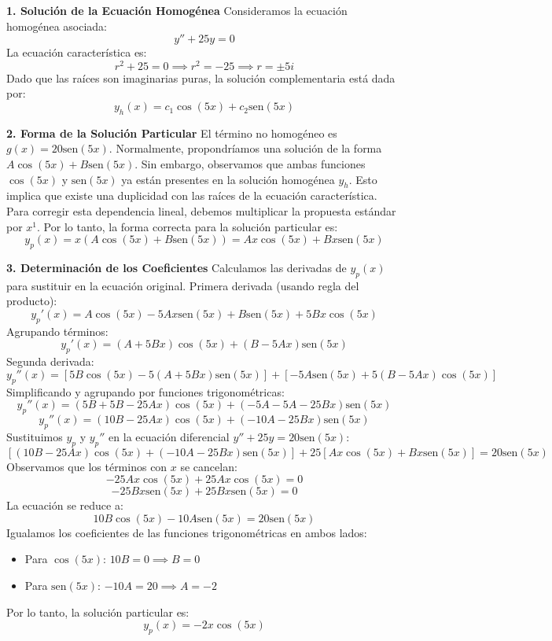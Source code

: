 \documentclass[a4paper]{article}
\begin{document}
\textbf{1. Solución de la Ecuación Homogénea}
Consideramos la ecuación homogénea asociada:
$$
y'' + 25y = 0
$$
La ecuación característica es:
$$
r^2 + 25 = 0 \implies r^2 = -25 \implies r = \pm 5i
$$
Dado que las raíces son imaginarias puras, la solución complementaria está dada por:
$$
y_h(x) = c_1 \cos(5x) + c_2 \text{sen}(5x)
$$

\textbf{2. Forma de la Solución Particular}
El término no homogéneo es $g(x) = 20\text{sen}(5x)$. Normalmente, propondríamos una solución de la forma $A \cos(5x) + B \text{sen}(5x)$. Sin embargo, observamos que ambas funciones $\cos(5x)$ y $\text{sen}(5x)$ ya están presentes en la solución homogénea $y_h$. Esto implica que existe una duplicidad con las raíces de la ecuación característica.
Para corregir esta dependencia lineal, debemos multiplicar la propuesta estándar por $x^1$. Por lo tanto, la forma correcta para la solución particular es:
$$
y_p(x) = x(A \cos(5x) + B \text{sen}(5x)) = Ax \cos(5x) + Bx \text{sen}(5x)
$$

\textbf{3. Determinación de los Coeficientes}
Calculamos las derivadas de $y_p(x)$ para sustituir en la ecuación original.
Primera derivada (usando regla del producto):
$$
y_p'(x) = A \cos(5x) - 5Ax \text{sen}(5x) + B \text{sen}(5x) + 5Bx \cos(5x)
$$
Agrupando términos:
$$
y_p'(x) = (A + 5Bx) \cos(5x) + (B - 5Ax) \text{sen}(5x)
$$
Segunda derivada:
$$
y_p''(x) = [5B \cos(5x) - 5(A + 5Bx) \text{sen}(5x)] + [-5A \text{sen}(5x) + 5(B - 5Ax) \cos(5x)]
$$
Simplificando y agrupando por funciones trigonométricas:
$$
y_p''(x) = (5B + 5B - 25Ax) \cos(5x) + (-5A - 5A - 25Bx) \text{sen}(5x)
$$
$$
y_p''(x) = (10B - 25Ax) \cos(5x) + (-10A - 25Bx) \text{sen}(5x)
$$
Sustituimos $y_p$ y $y_p''$ en la ecuación diferencial $y'' + 25y = 20\text{sen}(5x)$:
$$
[(10B - 25Ax) \cos(5x) + (-10A - 25Bx) \text{sen}(5x)] + 25[Ax \cos(5x) + Bx \text{sen}(5x)] = 20\text{sen}(5x)
$$
Observamos que los términos con $x$ se cancelan:
$$
-25Ax \cos(5x) + 25Ax \cos(5x) = 0
$$
$$
-25Bx \text{sen}(5x) + 25Bx \text{sen}(5x) = 0
$$
La ecuación se reduce a:
$$
10B \cos(5x) - 10A \text{sen}(5x) = 20\text{sen}(5x)
$$
Igualamos los coeficientes de las funciones trigonométricas en ambos lados:
\begin{itemize}
    \item Para $\cos(5x)$: $10B = 0 \implies B = 0$
    \item Para $\text{sen}(5x)$: $-10A = 20 \implies A = -2$
\end{itemize}
Por lo tanto, la solución particular es:
$$
y_p(x) = -2x \cos(5x)
$$
\end{document}
